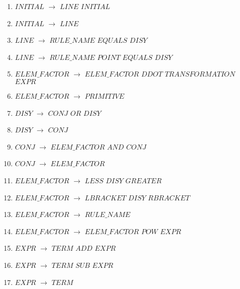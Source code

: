 \begin{enumerate}
\item $INITIAL$   $\rightarrow$  $LINE$ $INITIAL$ \\
\item $INITIAL$   $\rightarrow$  $LINE$ \\
\item $LINE$   $\rightarrow$  $RULE\_NAME$ $EQUALS$ $DISY$ \\
\item $LINE$   $\rightarrow$  $RULE\_NAME$ $POINT$ $EQUALS$ $DISY$ \\

\item $ELEM\_FACTOR$  $\rightarrow$  $ELEM\_FACTOR$ $DDOT$ $TRANSFORMATION$ $EXPR$ \\
\item $ELEM\_FACTOR$  $\rightarrow$  $PRIMITIVE$ \\
\item $DISY$   	$\rightarrow$  $CONJ$ $OR$ $DISY$ \\
\item $DISY$   	$\rightarrow$  $CONJ$ \\

\item $CONJ$   	$\rightarrow$  $ELEM\_FACTOR$ $AND$ $CONJ$ \\
\item $CONJ$   	$\rightarrow$  $ELEM\_FACTOR$ \\

\item $ELEM\_FACTOR$   	$\rightarrow$  $LESS$ $DISY$ $GREATER$ \\
\item $ELEM\_FACTOR$   	$\rightarrow$  $LBRACKET$ $DISY$ $RBRACKET$ \\
\item $ELEM\_FACTOR$ 	$\rightarrow$  $RULE\_NAME$ \\
\item $ELEM\_FACTOR$   	$\rightarrow$  $ELEM\_FACTOR$ $POW$ $EXPR$\\

\item $EXPR$ $\rightarrow$ $TERM$ $ADD$ $EXPR$ \\
\item $EXPR$ $\rightarrow$ $TERM$ $SUB$ $EXPR$ \\
\item $EXPR$ $\rightarrow$ $TERM$ \\


\end{enumerate}
